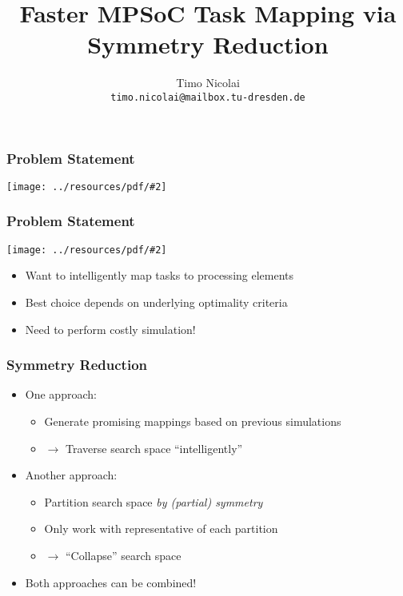 \documentclass{beamer}
\newcommand{\includeressource}[2][]{\texttt{[image: ../resources/pdf/\#2]}}
\begin{document}
\title{Faster MPSoC Task Mapping via\\Symmetry Reduction}
\author{Timo Nicolai\\\texttt{timo.nicolai@mailbox.tu-dresden.de}}

\begin{frame}
\titlepage
\end{frame}

\begin{frame}
  \frametitle{Problem Statement}

  \begin{center}
    \includeressource[width=.5\linewidth]{regular_mesh_m_n.pdf}
  \end{center}
\end{frame}

\begin{frame}
  \frametitle{Problem Statement}

  \begin{center}
    \includeressource[width=.3\linewidth]{regular_mesh_m_n.pdf}
  \end{center}

  \begin{itemize}
    \item<1-> Want to intelligently map tasks to processing elements
    \item<2-> Best choice depends on underlying optimality criteria
    \item<3-> Need to perform costly simulation!
  \end{itemize}
\end{frame}

\begin{frame}
  \frametitle{Symmetry Reduction}

  \begin{itemize}
    \setlength\itemsep{.25cm}
    \item<1-> One approach:
      \begin{itemize}
        \item<1-> Generate promising mappings based on previous simulations
        \item<2-> $\rightarrow$ Traverse search space ``intelligently''
      \end{itemize}
    \item<3-> Another approach:
      \begin{itemize}
        \item<3-> Partition search space \textit{by (partial) symmetry}
        \item<4-> Only work with representative of each partition
        \item<5-> $\rightarrow$ ``Collapse'' search space
       \end{itemize}
    \item<6-> Both approaches can be combined!
  \end{itemize}
\end{frame}
\end{document}
